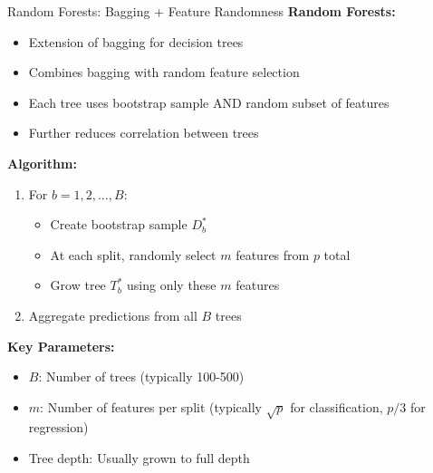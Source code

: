 \documentclass[aspectratio=169]{beamer}
\begin{document}
\begin{frame}{Random Forests: Bagging + Feature Randomness}
\footnotesize
\textbf{Random Forests:}
\begin{itemize}
    \item Extension of bagging for decision trees
    \item Combines bagging with random feature selection
    \item Each tree uses bootstrap sample AND random subset of features
    \item Further reduces correlation between trees
\end{itemize}

\vspace{0.15cm}
\textbf{Algorithm:}
\begin{enumerate}
    \item For $b = 1, 2, \ldots, B$:
    \begin{itemize}
        \item Create bootstrap sample $D^*_b$
        \item At each split, randomly select $m$ features from $p$ total
        \item Grow tree $T^*_b$ using only these $m$ features
    \end{itemize}
    \item Aggregate predictions from all $B$ trees
\end{enumerate}

\vspace{0.15cm}
\textbf{Key Parameters:}
\begin{itemize}
    \item $B$: Number of trees (typically 100-500)
    \item $m$: Number of features per split (typically $\sqrt{p}$ for classification, $p/3$ for regression)
    \item Tree depth: Usually grown to full depth
\end{itemize}
\end{frame}
\end{document}
